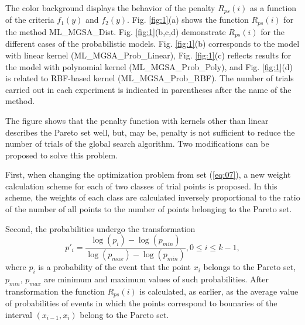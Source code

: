 \documentclass[runningheads]{llncs}
\begin{document}
The color background displays the behavior of the penalty $R_{ps}(i)$ as a function of the criteria $f_1(y)$ and $f_2(y)$. Fig. \ref{fig:1}(a) shows the function $R_{ps}(i)$ for the method ML\_MGSA\_Dist. Fig. \ref{fig:1}(b,c,d) demonstrate $R_{ps}(i)$ for the different cases of the probabilistic models. Fig. \ref{fig:1}(b) corresponds to the model with linear kernel (ML\_MGSA\_Prob\_Linear), Fig. \ref{fig:1}(c) reflects results for the model with polynomial kernel (ML\_MGSA\_Prob\_Poly), and Fig. \ref{fig:1}(d) is related to RBF-based kernel (ML\_MGSA\_Prob\_RBF).
The number of trials carried out in each experiment is indicated in parentheses after the name of the method.

The figure shows that the penalty function with kernels other than linear describes the Pareto set well, but, may be, penalty is not sufficient to reduce the number of trials of the global search algorithm. Two modifications can be proposed to solve this problem.

First, when changing the optimization problem from set (\ref{eq:07}), a new weight calculation scheme for each of two classes of trial points is proposed. In this scheme, the weights of each class are calculated inversely proportional to the ratio of the number of all points to the number of points belonging to the Pareto set.

Second, the probabilities undergo the transformation
\begin{equation}
    \label{eq:18}
p'_i= \frac{ \log (p_i) - \log (p_{min})}{ \log (p_{max}) - \log (p_{min})} , 0 \leq i \leq k-1,
\end{equation}
where $p_i$ is a probability of the event that the point $x_i$ belongs to the Pareto set, $p_{min}$, $p_{max}$ are minimum and maximum values of such probabilities. After transformation the function $R_{ps}(i)$ is calculated, as earlier, as the average value of probabilities of events in which the points correspond to bounaries of the interval $(x_{i-1}, x_i)$ belong to the Pareto set.
\end{document}
